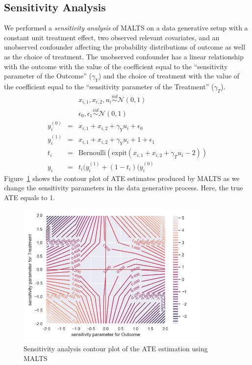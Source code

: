 \subsection*{Sensitivity Analysis}
We performed a \textit{sensitivity analysis} of MALTS on a data generative setup with a constant unit treatment effect, two observed relevant covariates, and an unobserved confounder affecting the probability distributions of outcome as well as the choice of treatment. The unobserved confounder has a linear relationship with the outcome with the value of the coefficient equal to the ``sensitivity parameter of the Outcome'' ($\gamma_Y$) and the choice of treatment with the value of the coefficient equal to the ``sensitivity parameter of the Treatment'' ($\gamma_T$).
\begin{eqnarray*}
    && x_{i,1},x_{i,2}, u_i \overset{iid}{\sim} \mathcal{N}(0,1)\\
    && \epsilon_0, \epsilon_1 \overset{iid}{\sim} \mathcal{N}(0,1)\\
    y_i^{(0)} &=& x_{i,1} + x_{i,2} + \gamma_Y u_i + \epsilon_0 \\
    y_i^{(1)} &=& x_{i,1} + x_{i,2} + \gamma_Y u_i + 1 + \epsilon_1 \\
    t_i &=& \text{Bernoulli}\left(\text{expit}\left( x_{i,1} + x_{i,2} + \gamma_T u_i - 2 \right) \right)\\
    y_i &=& t_i(y_i^{(1)} + (1-t_i)(y_i^{(0)}
\end{eqnarray*}
Figure~\ref{fig:sensitivity} shows the contour plot of ATE estimates produced by MALTS as we change the sensitivity parameters in the data generative process. Here, the true ATE equals to 1.
    \begin{figure}
        \centering
        \includegraphics[width=0.85\textwidth]{Figures/sensitivity_analysis.png}
        \caption{Sensitivity analysis contour plot of the ATE estimation using MALTS}
        \label{fig:sensitivity}
    \end{figure}
